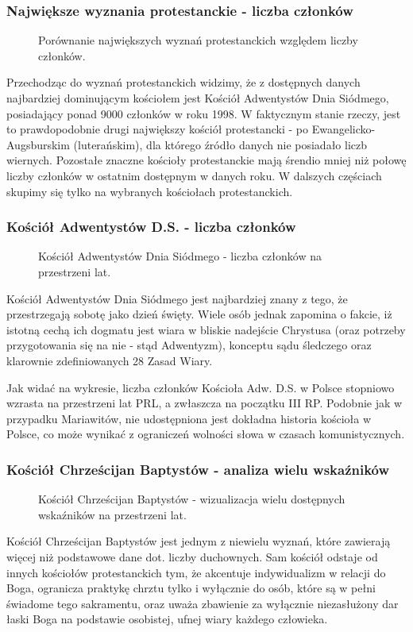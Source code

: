\documentclass[12pt]{article}
\begin{document}
\subsubsection{Największe wyznania protestanckie - liczba członków}
\begin{figure}[H]
    
    \caption{Porównanie największych wyznań protestanckich względem liczby członków.}
\end{figure}
Przechodząc do wyznań protestanckich widzimy, że z dostępnych danych najbardziej dominującym kościołem jest Kościół Adwentystów Dnia Siódmego, posiadający ponad 9000 członków w roku 1998. W faktycznym stanie 
rzeczy, jest to prawdopodobnie drugi największy kościół protestancki - po Ewangelicko-Augsburskim (luterańskim), dla którego źródło danych nie posiadało liczb wiernych. 
Pozostałe znaczne kościoły protestanckie mają śrendio mniej niż połowę liczby członków w ostatnim dostępnym w danych roku. W dalszych częściach skupimy się tylko na wybranych kościołach protestanckich. 

\subsubsection{Kościół Adwentystów D.S. - liczba członków}
\begin{figure}[H]
    
    \caption{Kościół Adwentystów Dnia Siódmego - liczba członków na przestrzeni lat.}
\end{figure}
Kościół Adwentystów Dnia Siódmego jest najbardziej znany z tego, że przestrzegają sobotę jako dzień święty. Wiele osób jednak zapomina o fakcie, iż istotną cechą ich dogmatu jest wiara w bliskie  
nadejście Chrystusa (oraz potrzeby przygotowania się na nie - stąd Adwentyzm), konceptu sądu śledczego oraz klarownie zdefiniowanych 28 Zasad Wiary.

Jak widać na wykresie, liczba członków Kościoła Adw. D.S. w Polsce stopniowo wzrasta na przestrzeni lat PRL, a zwłaszcza na początku III RP. Podobnie jak w przypadku Mariawitów, nie udostępniona jest dokładna 
historia kościoła w Polsce, co może wynikać z ograniczeń wolności słowa w czasach komunistycznych.  

\subsubsection{Kościół Chrześcijan Baptystów - analiza wielu wskaźników}
\begin{figure}[H]
    
    \caption{Kościół Chrześcijan Baptystów - wizualizacja wielu dostępnych wskaźników na przestrzeni lat.}
\end{figure}
Kościół Chrześcijan Baptystów jest jednym z niewielu wyznań, które zawierają więcej niż podstawowe dane dot. liczby duchownych. 
Sam kościół odstaje od innych kościołów protestanckich tym, że akcentuje indywidualizm w relacji do Boga, ogranicza praktykę chrztu tylko i wyłącznie do osób, które są w pełni świadome tego sakramentu, 
oraz uważa zbawienie za wyłącznie niezasłużony dar łaski Boga na podstawie osobistej, ufnej wiary każdego człowieka.   
\end{document}
